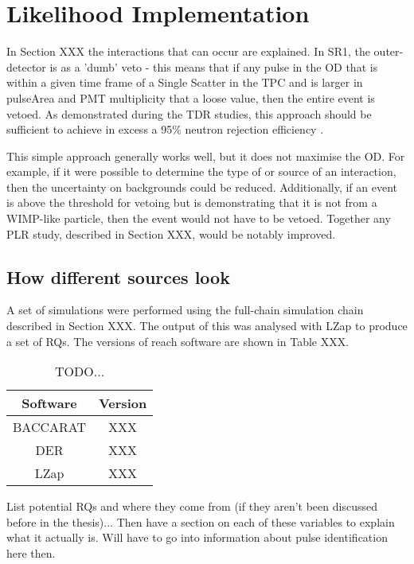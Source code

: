 \section{Likelihood Implementation}
\par
In Section XXX the interactions that can occur are explained.
In SR1, the outer-detector is as a 'dumb' veto - this means that if any pulse in the OD that is within a given time frame of a Single Scatter in the TPC and is larger in pulseArea and PMT multiplicity that a loose value, then the entire event is vetoed.
As demonstrated during the TDR studies, this approach should be sufficient to achieve in excess a 95\% neutron rejection efficiency \cite{LZ_TechnicalDesignReview_ref}.

\par
This simple approach generally works well, but it does not maximise the OD.
For example, if it were possible to determine the type of or source of an interaction, then the uncertainty on backgrounds could be reduced.
Additionally, if an event is above the threshold for vetoing but is demonstrating that it is not from a WIMP-like particle, then the event would not have to be vetoed.
Together any PLR study, described in Section XXX, would be notably improved.

\subsection{How different sources look}
\par
A set of simulations were performed using the full-chain simulation chain described in Section XXX.
The output of this was analysed with LZap to produce a set of RQs.
The versions of reach software are shown in Table XXX.

\begin{table}[!htbp]
    \centering
    \begin{tabular}{c|c}
        Software & Version \\ \hline
        BACCARAT & XXX\\
        DER & XXX\\
        LZap & XXX
    \end{tabular}
    \caption{TODO...}
    \label{tab:od_simulation_versions}
\end{table}


\par
List potential RQs and where they come from (if they aren't been discussed before in the thesis)...
Then have a section on each of these variables to explain what it actually is.
Will have to go into information about pulse identification here then.
